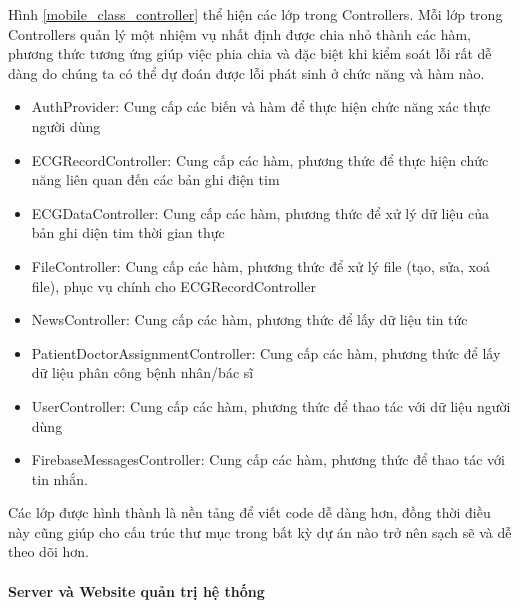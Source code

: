 \begin{enumerate}[a)]
  Hình \ref{mobile_class_controller} thể hiện các lớp trong Controllers. Mỗi lớp trong Controllers quản lý một nhiệm vụ
  nhất định được chia nhỏ thành các hàm, phương thức tương ứng giúp việc phia chia và đặc biệt khi kiểm soát lỗi rất dễ dàng do
  chúng ta có thể dự đoán được lỗi phát sinh ở chức năng và hàm nào. 

  \begin{itemize}
    \item AuthProvider: Cung cấp các biến và hàm để thực hiện chức năng xác thực người dùng
    \item ECGRecordController: Cung cấp các hàm, phương thức để thực hiện chức năng liên quan đến các bản ghi điện tim
    \item ECGDataController: Cung cấp các hàm, phương thức để xử lý dữ liệu của bản ghi diện tim thời gian thực
    \item FileController: Cung cấp các hàm, phương thức để xử lý file (tạo, sửa, xoá file), phục vụ chính cho ECGRecordController  
    \item NewsController: Cung cấp các hàm, phương thức để lấy dữ liệu tin tức
    \item PatientDoctorAssignmentController: Cung cấp các hàm, phương thức để lấy dữ liệu phân công bệnh nhân/bác sĩ
    \item UserController: Cung cấp các hàm, phương thức để thao tác với dữ liệu người dùng 
    \item FirebaseMessagesController: Cung cấp các hàm, phương thức để thao tác với tin nhắn.
  \end{itemize}

  Các lớp được hình thành là nền tảng để viết code dễ dàng hơn, đồng thời điều này cũng giúp cho cấu trúc thư mục trong
  bất kỳ dự án nào trở nên sạch sẽ và dễ theo dõi hơn.
  
  \end{enumerate}

\paragraph{Server và Website quản trị hệ thống}
\mbox{}


